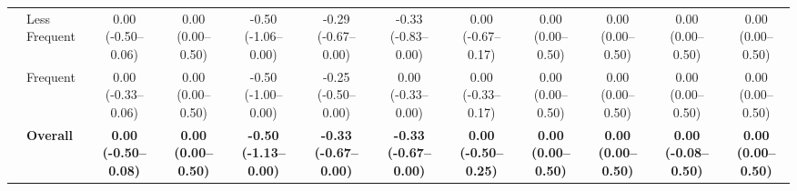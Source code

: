 \documentclass[10pt,journal,compsoc, onecolumn]{IEEEtran}
\begin{document}
\begin{table}[!htbp]
{\begin{tabular}{ll ccc @{\hskip 4pt} c @{\hskip 4pt} cc @{\hskip 4pt} ccc @{\hskip 4pt} c}
& Less Frequent & 0.00 (-0.50--0.06) & 0.00 (0.00--0.50) & -0.50 (-1.06--0.00) & -0.29 (-0.67--0.00) & -0.33 (-0.83--0.00) & 0.00 (-0.67--0.17) & 0.00 (0.00--0.50) & 0.00 (0.00--0.50) & 0.00 (0.00--0.50) & 0.00 (0.00--0.50) \\
& Frequent & 0.00 (-0.33--0.06) & 0.00 (0.00--0.50) & -0.50 (-1.00--0.00) & -0.25 (-0.50--0.00) & 0.00 (-0.33--0.00) & 0.00 (-0.33--0.17) & 0.00 (0.00--0.50) & 0.00 (0.00--0.50) & 0.00 (0.00--0.50) & 0.00 (0.00--0.50) \\
\cmidrule{2-12}
& \textbf{Overall} & \textbf{0.00 (-0.50--0.08)} & \textbf{0.00 (0.00--0.50)} & \textbf{-0.50 (-1.13--0.00)} & \textbf{-0.33 (-0.67--0.00)} & \textbf{-0.33 (-0.67--0.00)} & \textbf{0.00 (-0.50--0.25)} & \textbf{0.00 (0.00--0.50)} & \textbf{0.00 (0.00--0.50)} & \textbf{0.00 (-0.08--0.50)} & \textbf{0.00 (0.00--0.50)} \\
\bottomrule
\end{tabular}%
}
\end{table}




\end{document}

